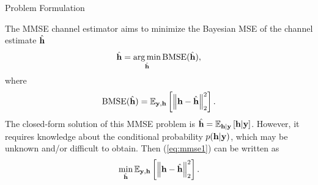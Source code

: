 \documentclass[hyperref={bookmarks=false}]{beamer}
\numberwithin{figure}{section}
\begin{document}
\begin{frame}{Problem Formulation}

The MMSE channel estimator aims to minimize the Bayesian MSE of the channel estimate $\hat{{\bf h}}$ 
\begin{equation} \label{eq:mmse1}
    \hat{{\bf h}} = \operatorname*{arg\,min}_{\hat{{\bf h}}} \mathrm{BMSE}(\hat{{\bf h}}),
\end{equation}
where
\begin{equation} \label{eq:bmse}
    \mathrm{BMSE}(\hat{{\bf h}}) = \mathbb{E}_{{\bf y},{\bf h}}\left[\left\| {\bf h}-\hat{{\bf h}} \right\|^2_2\right].
\end{equation}
The closed-form solution of this MMSE problem is $\hat{{\bf h}} = \mathbb{E}_{{\bf h}|{\bf y}}\left[{\bf h}|{\bf y}\right]$. However, it requires knowledge about the conditional probability
$p({\bf h}|{\bf y})$, which may be unknown and/or difficult to obtain. Then (\ref{eq:mmse1}) can be written as
\begin{equation} \label{eq:mmse2}
    \min_{\hat{{\bf h}}} \mathbb{E}_{{\bf y},{\bf h}}\left[\left\| {\bf h}-\hat{{\bf h}} \right\|^2_2\right].
\end{equation}\\


\end{frame}
\end{document}
